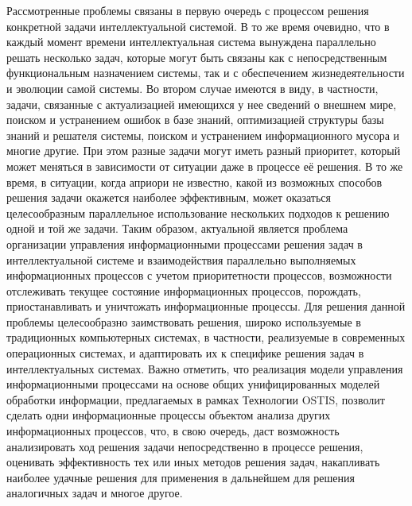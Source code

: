 Рассмотренные проблемы связаны в первую очередь с процессом решения конкретной задачи интеллектуальной системой. В то же время очевидно, что в каждый момент времени интеллектуальная система вынуждена параллельно решать несколько задач, которые могут быть связаны как с непосредственным функциональным назначением системы, так и с обеспечением жизнедеятельности и эволюции самой системы. Во втором случае имеются в виду, в частности, задачи, связанные с актуализацией имеющихся у нее сведений о внешнем мире, поиском и устранением ошибок в базе знаний, оптимизацией структуры базы знаний и решателя системы, поиском и устранением информационного мусора и многие другие. При этом разные задачи могут иметь разный приоритет, который может меняться в зависимости от ситуации даже в процессе её решения. В то же время, в ситуации, когда априори не известно, какой из возможных способов решения задачи окажется наиболее эффективным, может оказаться целесообразным параллельное использование нескольких подходов к решению одной и той же задачи. Таким образом, актуальной является проблема организации управления информационными процессами решения задач в интеллектуальной системе и взаимодействия параллельно выполняемых информационных процессов с учетом приоритетности процессов, возможности отслеживать текущее состояние информационных процессов, порождать, приостанавливать и уничтожать информационные процессы. Для решения данной проблемы целесообразно заимствовать решения, широко используемые в традиционных компьютерных системах, в частности, реализуемые в современных операционных системах, и адаптировать их к специфике решения задач в интеллектуальных системах. Важно отметить, что реализация модели управления информационными процессами на основе общих унифицированных моделей обработки информации, предлагаемых в рамках Технологии OSTIS, позволит сделать одни информационные процессы объектом анализа других информационных процессов, что, в свою очередь, даст возможность анализировать ход решения задачи непосредственно в процессе решения, оценивать эффективность тех или иных методов решения задач, накапливать наиболее удачные решения для применения в дальнейшем для решения аналогичных задач и многое другое.


